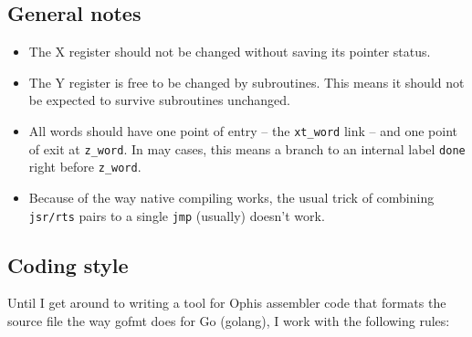 \subsection{General notes}

\begin{itemize}

        \item The X register should not be changed without
                saving its pointer status.

        \item The Y register is free to be changed by
                subroutines. This means it should not be expected to survive
                subroutines unchanged.

        \item All words should have one point of entry -- the \texttt{xt\_word}
                link -- and one point of exit at \texttt{z\_word}. In may cases,
                this means a branch to an internal label \texttt{done} right
                before \texttt{z\_word}.

        \item Because of the way native compiling works, the usual trick of
                combining \texttt{jsr/rts} pairs to a single \texttt{jmp}
                (usually) doesn't work.

\end{itemize}


\subsection{Coding style}

Until I get around to writing a tool for Ophis assembler
code that formats the source file the way gofmt does for Go (golang),
I work with the following rules:

